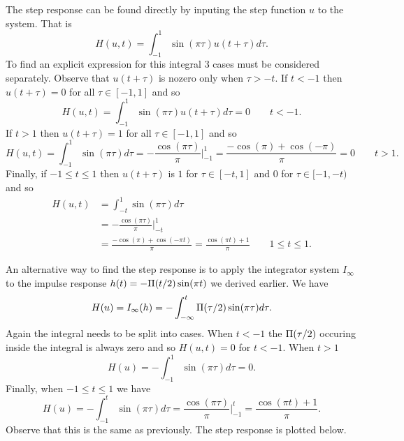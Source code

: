 \begin{excersizelist}
\begin{solution}
The step response can be found directly by inputing the step function $u$ to the system.  That is
\[ 
H(u,t) = \int_{-1}^{1} \sin(\pi\tau) u(t + \tau) d\tau.
\]  
To find an explicit expression for this integral 3 cases must be considered separately.  Observe that $u(t + \tau)$ is nozero only when $\tau > -t$.  If $t < -1$ then $u(t + \tau) = 0$ for all $\tau \in [-1,1]$ and so
\[
H(u,t) = \int_{-1}^{1} \sin(\pi\tau) u(t + \tau) d\tau = 0 \qquad t < -1.
\] 
If $t > 1$ then $u(t + \tau) = 1$ for all $\tau \in [-1,1]$ and so
\[
H(u,t) = \int_{-1}^{1} \sin(\pi\tau) d\tau = -\frac{\cos(\pi\tau)}{\pi} \big\vert_{-1}^1 = \frac{-\cos(\pi) + \cos(-\pi)}{\pi} = 0 \qquad t > 1.
\]
Finally, if $-1 \leq t \leq 1$ then $u(t + \tau)$ is $1$ for $\tau \in [-t,1]$ and $0$ for $\tau \in [-1,-t)$ and so
\begin{align*}
H(u,t) &= \int_{-t}^{1} \sin(\pi\tau) d\tau \\
&= -\frac{\cos(\pi\tau)}{\pi} \big\vert_{-t}^1 \\
&= \frac{-\cos(\pi) + \cos(-\pi t)}{\pi} = \frac{\cos(\pi t) + 1}{\pi} \qquad 1 \leq t \leq 1.
\end{align*}

An alternative way to find the step response is to apply the integrator system $I_\infty$ to the impulse response $h(t) = -\Pi(t/2) \sin(\pi t)$ we derived earlier.  We have
\[
H(u) = I_\infty(h) = -\int_{-\infty}^t \Pi(\tau/2) \sin(\pi \tau) d\tau.
\]
Again the integral needs to be split into cases.  When $t < -1$ the $\Pi(\tau/2)$ occuring inside the integral is always zero and so $H(u,t) = 0$ for $t < -1$.  When $t > 1$ 
\[
H(u) = -\int_{-1}^1 \sin(\pi \tau) d\tau = 0.
\]
Finally, when $-1 \leq t \leq 1$ we have
\[
H(u) = -\int_{-1}^t \sin(\pi \tau) d\tau  = \frac{\cos(\pi \tau)}{\pi} \big\vert_{-1}^t = \frac{\cos(\pi t) + 1}{\pi}.
\]
Observe that this is the same as previously.  The step response is plotted below.

\begin{center}
\end{center}
\end{solution}
\end{excersizelist}
